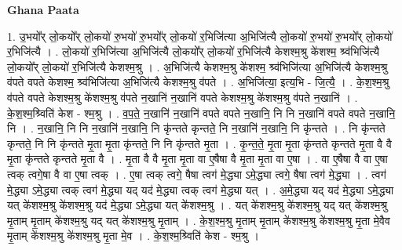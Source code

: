 \documentclass[17pt]{extarticle}
\begin{document}
\textbf{Ghana Paata } \newline

1. उ॒भयो᳚र् लो॒कयो᳚र् लो॒कयो॑ रु॒भयो॑ रु॒भयो᳚र् लो॒कयो॑ र॒भिजि॑त्या अ॒भिजि॑त्यै लो॒कयो॑ रु॒भयो॑ रु॒भयो᳚र् लो॒कयो॑ र॒भिजि॑त्यै । . लो॒कयो॑ र॒भिजि॑त्या अ॒भिजि॑त्यै लो॒कयो᳚र् लो॒कयो॑ र॒भिजि॑त्यै केशश्म॒श्रु के॑शश्म॒ श्र्व॑भिजि॑त्यै लो॒कयो᳚र् लो॒कयो॑ र॒भिजि॑त्यै केशश्म॒श्रु । . अ॒भिजि॑त्यै केशश्म॒श्रु के॑शश्म॒ श्र्व॑भिजि॑त्या अ॒भिजि॑त्यै केशश्म॒श्रु व॑पते वपते केशश्म॒ श्र्व॑भिजि॑त्या अ॒भिजि॑त्यै केशश्म॒श्रु व॑पते । . अ॒भिजि॑त्या॒ इत्य॒भि - जि॒त्यै॒ । . के॒श॒श्म॒श्रु व॑पते वपते केशश्म॒श्रु के॑शश्म॒श्रु व॑पते न॒खानि॑ न॒खानि॑ वपते केशश्म॒श्रु के॑शश्म॒श्रु व॑पते न॒खानि॑ । . के॒श॒श्म॒श्र्विति॑ केश - श्म॒श्रु । . व॒प॒ते॒ न॒खानि॑ न॒खानि॑ वपते वपते न॒खानि॒ नि नि न॒खानि॑ वपते वपते न॒खानि॒ नि । . न॒खानि॒ नि नि न॒खानि॑ न॒खानि॒ नि कृ॑न्तते कृन्तते॒ नि न॒खानि॑ न॒खानि॒ नि कृ॑न्तते । . नि कृ॑न्तते कृन्तते॒ नि नि कृ॑न्तते मृ॒ता मृ॒ता कृ॑न्तते॒ नि नि कृ॑न्तते मृ॒ता । . कृ॒न्त॒ते॒ मृ॒ता मृ॒ता कृ॑न्तते कृन्तते मृ॒ता वै वै मृ॒ता कृ॑न्तते कृन्तते मृ॒ता वै । . मृ॒ता वै वै मृ॒ता मृ॒ता वा ए॒षैषा वै मृ॒ता मृ॒ता वा ए॒षा । . वा ए॒षैषा वै वा ए॒षा त्वक् त्वगे॒षा वै वा ए॒षा त्वक् । . ए॒षा त्वक् त्वगे॒ षैषा त्वग॑ मे॒द्ध्या ऽमे॒द्ध्या त्वगे॒ षैषा त्वग॑ मे॒द्ध्या । . त्वग॑ मे॒द्ध्या ऽमे॒द्ध्या त्वक् त्वग॑ मे॒द्ध्या यद् यद॑ मे॒द्ध्या त्वक् त्वग॑ मे॒द्ध्या यत् । . अ॒मे॒द्ध्या यद् यद॑ मे॒द्ध्या ऽमे॒द्ध्या यत् के॑शश्म॒श्रु के॑शश्म॒श्रु यद॑ मे॒द्ध्या ऽमे॒द्ध्या यत् के॑शश्म॒श्रु । . यत् के॑शश्म॒श्रु के॑शश्म॒श्रु यद् यत् के॑शश्म॒श्रु मृ॒ताम् मृ॒ताम् के॑शश्म॒श्रु यद् यत् के॑शश्म॒श्रु मृ॒ताम् । . के॒श॒श्म॒श्रु मृ॒ताम् मृ॒ताम् के॑शश्म॒श्रु के॑शश्म॒श्रु मृ॒ता मे॒वैव मृ॒ताम् के॑शश्म॒श्रु के॑शश्म॒श्रु मृ॒ता मे॒व । . के॒श॒श्म॒श्र्विति॑ केश - श्म॒श्रु । \newline
\end{document}
